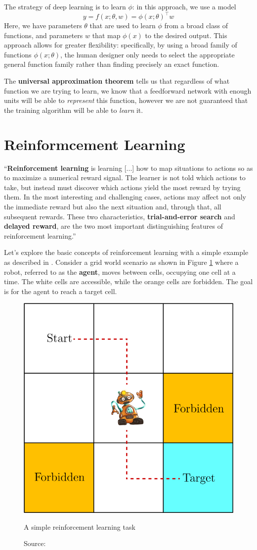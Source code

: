 The strategy of deep learning is to learn \( \phi \):
in this approach, we use a model
\[ y = f(x; \theta, w) = \phi(x; \theta)^\top w \]
Here, we have parameters \( \theta \) that are used to learn \( \phi \)
from a broad class of functions, and parameters \( w \) that map \( \phi(x) \)
to the desired output.
This approach allows for greater flexibility:
specifically, by using a broad family of functions
\( \phi(x; \theta) \), the human designer only needs to select the appropriate
general function family rather than finding precisely an exact function.

The \textbf{universal approximation theorem} \cite{HORNIK1989359}
tells us that regardless of what function
we are trying to learn, we know that a feedforward network with enough units
will be able to \emph{represent} this
function, however we are not guaranteed that the training algorithm will be able
to \emph{learn} it.

\section{Reinformcement Learning}

``\textbf{Reinforcement learning} is learning [...] how
to map situations to actions so
as to maximize a numerical reward signal.
The learner is not told which actions to
take, but instead must discover which actions
yield the most reward by trying them. In
the most interesting and challenging cases, actions may
affect not only the immediate
reward but also the next situation and,
through that, all subsequent rewards.
These two
characteristics, \textbf{trial-and-error search} and \textbf{delayed reward},
are the two most important
distinguishing features of reinforcement learning.'' \cite{sutton1998}

Let's explore the basic concepts of reinforcement learning with
a simple example as described in \cite{zhao2024RLBook}.
Consider a grid world scenario as shown in Figure \ref{fig:rl}
where a robot, referred to as
the \textbf{agent}, moves between cells, occupying one cell at a time.
The white cells are accessible, while the orange cells are forbidden.
The goal is for the agent to reach a target cell.

\begin{figure}[h]
    \centering
    \includegraphics[width=.42\textwidth]{figures/ch3/2.rl.png}
    \caption{A simple reinforcement learning task}
    \vspace{-10px}
    \caption*{\scriptsize{Source: \cite{zhao2024RLBook}}}
    \label{fig:rl}
\end{figure}

